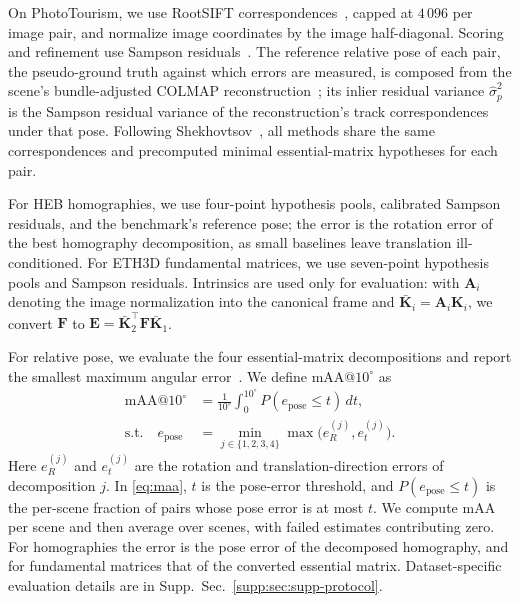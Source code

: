 \documentclass[runningheads]{llncs}
\newcommand{\suppsec}[1]{Supp.\ Sec.~\ref{supp:#1}}
\begin{document}
On PhotoTourism, we use RootSIFT correspondences~\cite{Arandjelovic2012},
capped at $4\,096$ per image pair, and normalize image coordinates by the
image half-diagonal. Scoring and
refinement use Sampson residuals~\cite{Hartley2003}. The reference relative
pose of each pair, the pseudo-ground truth against which errors are measured,
is composed from the scene's bundle-adjusted COLMAP
reconstruction~\cite{Schonberger2016,Jin2021}; its inlier residual variance
$\hat\sigma_p^2$ is the Sampson residual variance of the reconstruction's
track correspondences under that pose. Following
Shekhovtsov~\cite{Shekhovtsov2025}, all methods share the same correspondences
and precomputed minimal essential-matrix hypotheses for each pair.

For HEB homographies, we use four-point hypothesis pools, calibrated Sampson
residuals, and the benchmark's reference pose; the error is the rotation error of the best
homography decomposition, as small baselines leave translation ill-conditioned. For ETH3D
fundamental matrices, we use seven-point hypothesis pools and Sampson
residuals. Intrinsics are used only for evaluation: with $\mathbf{A}_i$ denoting the
image normalization into the canonical frame and $\bar{\mathbf K}_i=\mathbf{A}_i\mathbf
	K_i$, we convert $\mathbf F$ to $\mathbf E=\bar{\mathbf K}_2^\top\mathbf
	F\bar{\mathbf K}_1$.

For relative pose, we evaluate the four essential-matrix decompositions
and report the smallest maximum angular error~\cite{Jin2021}. We define
mAA@$10^\circ$ as
\begin{equation}
	\begin{aligned}
		\mathrm{mAA}@10^\circ
		 & =\frac{1}{10^\circ}\int_0^{10^\circ}
		P(e_{\mathrm{pose}}\le t)\,dt,                                 \\
		\text{s.t.}\quad e_{\mathrm{pose}}
		 & =\min_{j\in\{1,2,3,4\}}\max\bigl(e_R^{(j)},e_t^{(j)}\bigr).
	\end{aligned}
	\label{eq:maa}
\end{equation}
Here $e_R^{(j)}$ and $e_t^{(j)}$ are the rotation and
translation-direction errors of decomposition $j$. In \cref{eq:maa},
$t$ is the pose-error threshold, and $P(e_{\mathrm{pose}}\le t)$ is the
per-scene fraction of pairs whose pose error is at most $t$. We compute mAA
per scene and then average over scenes, with failed estimates contributing zero. For
homographies the error is the pose error of the decomposed
homography, and for fundamental matrices that of the converted essential
matrix. Dataset-specific evaluation details are in
\suppsec{sec:supp-protocol}.
\end{document}
